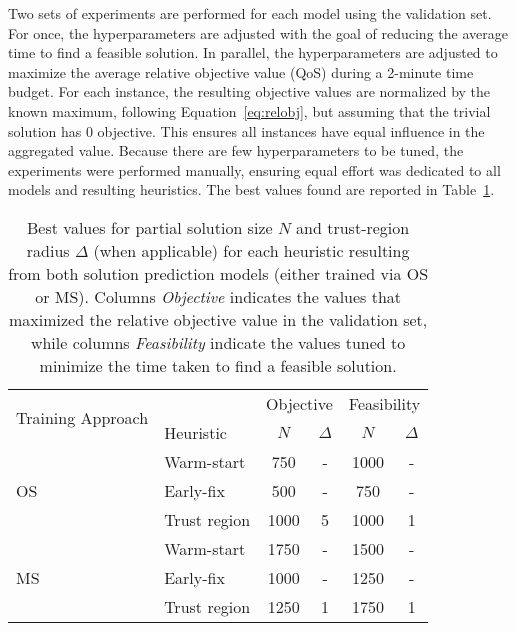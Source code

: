 Two sets of experiments are performed for each model using the validation set.
For once, the hyperparameters are adjusted with the goal of reducing the average time to find a feasible solution.
In parallel, the hyperparameters are adjusted to maximize the average relative objective value (QoS) during a 2-minute time budget.
For each instance, the resulting objective values are normalized by the known maximum, following Equation~\eqref{eq:relobj}, but assuming that the trivial solution has 0 objective.
This ensures all instances have equal influence in the aggregated value.
Because there are few hyperparameters to be tuned, the experiments were performed manually, ensuring equal effort was dedicated to all models and resulting heuristics.
The best values found are reported in Table~\ref{tab:best-N-delta}.

\begin{table}[h]
    \centering
    \caption{%
	Best values for partial solution size $N$ and trust-region radius $\Delta$ (when applicable) for each heuristic resulting from both solution prediction models (either trained via OS or MS).
	Columns \emph{Objective} indicates the values that maximized the relative objective value in the validation set, while columns \emph{Feasibility} indicate the values tuned to minimize the time taken to find a feasible solution.
 }
    \label{tab:best-N-delta}
    \begin{tabular}{ll|cc|cc}
    \toprule
    \multirow{2}{2cm}{Training Approach} & & \multicolumn{2}{c|}{Objective} & \multicolumn{2}{c}{Feasibility} \\
                            & Heuristic    & $N$         & $\Delta$        & $N$          & $\Delta$         \\
    \midrule
    \multirow{3}{*}{OS}      & Warm-start   & 750         & -               & 1000         & -                \\
                                        & Early-fix    & 500         & -               & 750          & -                \\
                                        & Trust region & 1000        & 5               & 1000         & 1                \\
    \midrule
    \multirow{3}{*}{MS} & Warm-start   & 1750        & -               & 1500         & -                \\
                                        & Early-fix    & 1000        & -               & 1250         & -                \\
                                        & Trust region & 1250        & 1               & 1750         & 1             \\
    \bottomrule 
    \end{tabular}
\end{table}

